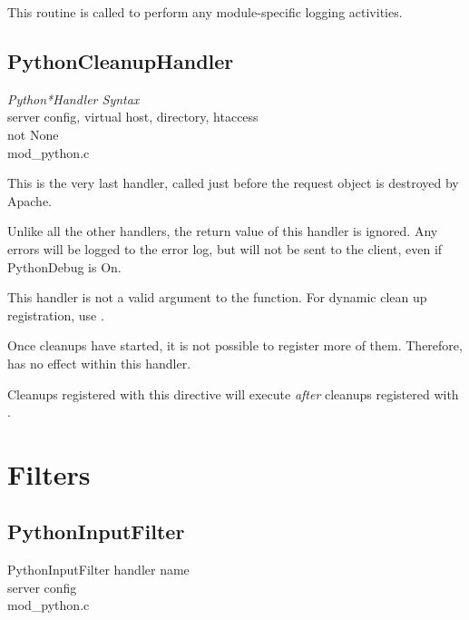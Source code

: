This routine is called to perform any module-specific logging
activities. 

\subsection{PythonCleanupHandler\label{dir-handlers-pch}}

\emph{Python*Handler Syntax}\\
server config, virtual host, directory, htaccess\\
not None\\
mod_python.c

This is the very last handler, called just before the request object
is destroyed by Apache.

Unlike all the other handlers, the return value of this handler is
ignored. Any errors will be logged to the error log, but will not be
sent to the client, even if PythonDebug is On.

This handler is not a valid argument to the 
function. For dynamic clean up registration, use
.

Once cleanups have started, it is not possible to register more of
them. Therefore,  has no effect within this
handler.

Cleanups registered with this directive will execute \emph{after} cleanups
registered with .

\section{Filters\label{dir-filter}}

\subsection{PythonInputFilter\label{dir-filter-if}}

PythonInputFilter handler name\\
server config\\
mod_python.c

